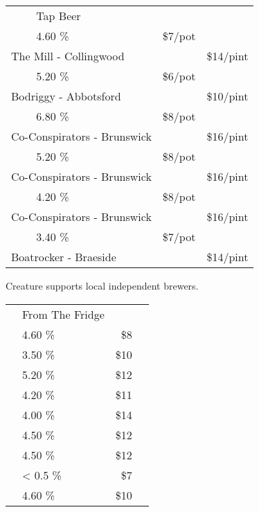 \documentclass[12pt]{article}
\makeatletter
\newcommand*\ColText[1]{\textcolor{SpringGreen4}{#1}}
\newcommand*\GroupGlassTitle[2]{%
  \noalign{\vspace{2em}}
  \fontfamily{qzc}\selectfont #2 & \vspace{1em}\fontsize{20}{29}\selectfont\ColText{#1}}
\newenvironment{Group}
  {\vspace{2em}\noindent\begin{tabular*}{\textwidth}{@{} p{10mm} l@{\extracolsep{\fill}} r@{\hspace{1em}} r@{}}} %
  {\end{tabular*}}
\newcommand*\Booze[3]{%
  \noalign{\vspace{1em}}
  \multicolumn{2}{l}{ #1 \tiny\dotfill } & \scriptsize #2 \% \tiny\dotfill & \normalsize \$#3}
\newcommand*\Beer[5]{%
  \noalign{\vspace{2em}}
  \Booze{#1}{#3}{#4\tiny/pot} \\
  \multicolumn{2}{l}{ \hspace*{0.1em} \scriptsize #2 } & {} & \normalsize \$#5\tiny/pint}
\newcommand*\Glass[2]{%
    \begin{tikzpicture}[remember picture,overlay]
        \node[xshift=5mm,yshift=0mm]{%
            \texttt{[image: Glasses/\#1.png]}
        };
    \end{tikzpicture}%
}
\newcommand*\GlassWeizen{%
    \Glass{weizen}{4mm}}
\newcommand*\GlassFridge{%
    \Glass{fridge}{7.5mm}}
\makeatother
\begin{document}
%


\begin{Group}
    \GroupGlassTitle{Tap Beer}{\GlassWeizen} \\
    \Beer{Daydream \textbf{Session Ale}}{The Mill - Collingwood}{4.60}{7}{14} \\
    \Beer{Blinker \textbf{Dark Ale}}{Bodriggy - Abbotsford}{5.20}{6}{10} \\
    \Beer{The Renegade \textbf{WC IPA}}{Co-Conspirators - Brunswick}{6.80}{8}{16} \\
    \Beer{The Beekeeper \textbf{Choc Honeycomb Porter}}{Co-Conspirators - Brunswick}{5.20}{8}{16} \\
    \Beer{The Wheelman \textbf{Raspberry Gose}}{Co-Conspirators - Brunswick}{4.20}{8}{16} \\
    \Beer{Miss Pinky \textbf{Raspberry Berliner Weisse}}{Boatrocker - Braeside}{3.40}{7}{14} \\
\end{Group}
\vfill
\begin{center}
	Creature supports local independent brewers.
\end{center}
\pagebreak
\begin{Group}
    \GroupGlassTitle{From The Fridge}{\GlassFridge} \\
    \Booze{Melbourne Bitter}{4.60}{8} \\
    \Booze{Bodriggy Speccy Juice \textbf{Hazy Session IPA}}{3.50}{10} \\
    \Booze{Stomping Ground \textbf{Pale Ale}}{5.20}{12} \\
    \Booze{Stomping Ground \textbf{Passionfruit Smash Sour}}{4.20}{11} \\
    \Booze{Lick Pier \textbf{Alcoholic Ginger Beer}}{4.00}{14} \\
    \Booze{Sopra Sicilian \textbf{Blood Orange Seltzer}}{4.50}{12} \\
    \Booze{Sopra Sicilian \textbf{Limoncello Seltzer}}{4.50}{12} \\
    \Booze{Hop Nation Mind Ya Head \textbf{Non Alcoholic XPA}}{< 0.5}{7} \\
    \Booze{Young Henry's \textbf{Cloudy Cider}}{4.60}{10} \\
\end{Group}
\end{document}

